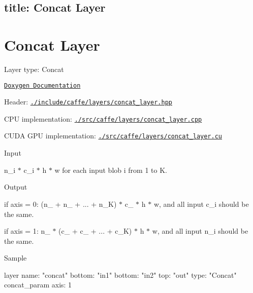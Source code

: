 

 \subsection*{title\+: Concat Layer }

\section*{Concat Layer}


\begin{DoxyItemize}
\item Layer type\+: {\ttfamily Concat}
\item \href{http://caffe.berkeleyvision.org/doxygen/classcaffe_1_1ConcatLayer.html}{\tt Doxygen Documentation}
\item Header\+: \href{https://github.com/BVLC/caffe/blob/master/include/caffe/layers/concat_layer.hpp}{\tt {\ttfamily ./include/caffe/layers/concat\+\_\+layer.hpp}}
\item C\+PU implementation\+: \href{https://github.com/BVLC/caffe/blob/master/src/caffe/layers/concat_layer.cpp}{\tt {\ttfamily ./src/caffe/layers/concat\+\_\+layer.cpp}}
\item C\+U\+DA G\+PU implementation\+: \href{https://github.com/BVLC/caffe/blob/master/src/caffe/layers/concat_layer.cu}{\tt {\ttfamily ./src/caffe/layers/concat\+\_\+layer.cu}}
\item Input
\begin{DoxyItemize}
\item {\ttfamily n\+\_\+i $\ast$ c\+\_\+i $\ast$ h $\ast$ w} for each input blob i from 1 to K.
\end{DoxyItemize}
\item Output
\begin{DoxyItemize}
\item if {\ttfamily axis = 0}\+: {\ttfamily (n\+\_ + n\+\_ + ... + n\+\_\+K) $\ast$ c\+\_ $\ast$ h $\ast$ w}, and all input {\ttfamily c\+\_\+i} should be the same.
\item if {\ttfamily axis = 1}\+: {\ttfamily n\+\_ $\ast$ (c\+\_ + c\+\_ + ... + c\+\_\+K) $\ast$ h $\ast$ w}, and all input {\ttfamily n\+\_\+i} should be the same.
\end{DoxyItemize}
\item Sample \begin{DoxyVerb}layer {
  name: "concat"
  bottom: "in1"
  bottom: "in2"
  top: "out"
  type: "Concat"
  concat_param {
    axis: 1
  }
}
\end{DoxyVerb}

\end{DoxyItemize}

